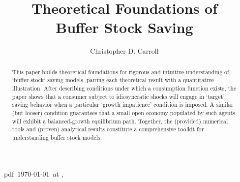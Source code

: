 \documentclass[BufferStockTheory]{subfiles}
\begin{document}
\providecommand{\versn}{pdf} %
\ifthenelse{\boolean{Web}}{    %
  \renewcommand{\versn}{Web}     %
  \renewcommand{\rootFromOut}{.} %
}{}  %

\hfill{\tiny \jobname~\versn~\today~{at} \DTMcurrenttime, ~~}

\title{Theoretical Foundations of \\ Buffer Stock Saving}

\author{Christopher D. Carroll\authNum}



\renewcommand{\forcedate}{\today}


\maketitle 
\hypertarget{abstract}{}
\begin{abstract}
  This paper builds theoretical foundations for rigorous and intuitive understanding of `buffer stock' saving models, pairing each theoretical result with a quantitative illustration.  After describing conditions under which a consumption function exists, the paper shows that a consumer subject to idiosyncratic shocks will engage in `target' saving behavior when a particular `growth impatience' condition is imposed.  A similar (but looser) condition guarantees that a small open economy populated by such agents will exhibit a balanced-growth equilibrium path.  Together, the (provided) numerical tools and (proven) analytical results constitute a comprehensive toolkit for understanding buffer stock models.
\end{abstract}
\end{document}
